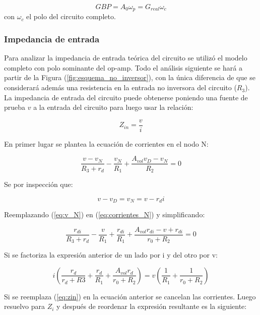 \begin{equation}\label{eq:GBP}
GBP = A_0\omega_p = G_{real}\omega_c
\end{equation}
con $\omega_c$ el polo del circuito completo.


\subsubsection{Impedancia de entrada}

Para analizar la impedancia de entrada teórica del circuito se utilizó el modelo completo con polo sominante del op-amp. Todo el análisis siguiente se hará a partir de la Figura (\ref{fig:esquema_no_inversor}), con la única diferencia de que se considerará además una resistencia en la entrada no inversora del circuito ($R_3$). La impedancia de entrada del circuito puede obtenerse poniendo una fuente de prueba $v$ a la entrada del circuito para luego usar la relación:

\begin{equation}\label{eq:zin}
Z_{in} = \frac{v}{i}
\end{equation}

En primer lugar se plantea la ecuación de corrientes en el nodo N:

\begin{equation}\label{eq:corrientes_N}
\frac{v - v_N}{R_3 + r_d} - \frac{v_N}{R_1} + \frac{A_{vol}v_D - v_N}{R_2} = 0
\end{equation}

Se por inspección que:

\begin{equation}\label{eq:v_N}
v - v_D = v_N = v - r_di
\end{equation}

Reemplazando (\ref{eq:v_N}) en (\ref{eq:corrientes_N}) y simplificando:

\begin{equation}
\frac{r_{di}}{R_3 + r_d} - \frac{v}{R_1} + \frac{r_{di}}{R_1} +\frac{A_{vol}r_{di} - v + r_{di}}{r_0 + R_2} = 0
\end{equation}

Si se factoriza la expresión anterior de un lado por i y del otro por v:

\begin{equation}
i \left(\frac{r_d}{r_d + R3} + \frac{r_d}{R_1} + \frac{A_{vol}r_d}{r_0 + R_2}\right) = v\left(\frac{1}{R_1} + \frac{1}{r_0 + R_2}\right)
\end{equation}

Si se reemplaza (\ref{eq:zin}) en la ecuación anterior se cancelan las corrientes. Luego resuelvo para $Z_i$ y después de reordenar la expresión resultante es la siguiente:

